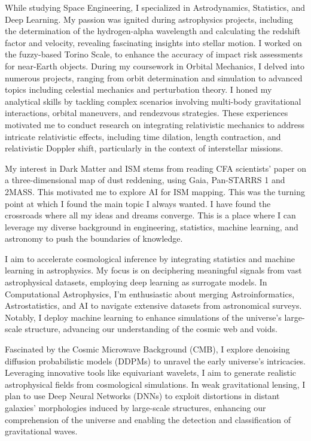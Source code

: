 \documentclass[a4,20pt]{article}
\begin{document}
\begin{large}
While studying Space Engineering, I specialized in Astrodynamics, Statistics, and Deep Learning. My passion was ignited during astrophysics projects, including the determination of the hydrogen-alpha wavelength and calculating the redshift factor and velocity, revealing fascinating insights into stellar motion. I worked on the fuzzy-based Torino Scale, to enhance the accuracy of impact risk assessments for near-Earth objects. During my coursework in Orbital Mechanics, I delved into numerous projects, ranging from orbit determination and simulation to advanced topics including celestial mechanics and perturbation theory. I honed my analytical skills by tackling complex scenarios involving multi-body gravitational interactions, orbital maneuvers, and rendezvous strategies. These experiences motivated me to conduct research on integrating relativistic mechanics to address intricate relativistic effects, including time dilation, length contraction, and relativistic Doppler shift, particularly in the context of interstellar missions. 


My interest in Dark Matter and ISM stems from reading CFA scientists' paper on a three-dimensional map of dust reddening, using Gaia, Pan-STARRS 1 and 2MASS. This motivated me to explore AI for ISM mapping. This was the turning point at which I found the main topic I always wanted. I have found the crossroads where all my ideas and dreams converge. This is a place where I can leverage my diverse background in engineering, statistics, machine learning, and astronomy to push the boundaries of knowledge.

I aim to accelerate cosmological inference by integrating statistics and machine learning in astrophysics. My focus is on deciphering meaningful signals from vast astrophysical datasets, employing deep learning as surrogate models. In Computational Astrophysics, I'm enthusiastic about merging Astroinformatics, Astrostatistics, and AI to navigate extensive datasets from astronomical surveys. Notably, I deploy machine learning to enhance simulations of the universe's large-scale structure, advancing our understanding of the cosmic web and voids.

Fascinated by the Cosmic Microwave Background (CMB), I explore denoising diffusion probabilistic models (DDPMs) to unravel the early universe's intricacies. Leveraging innovative tools like equivariant wavelets, I aim to generate realistic astrophysical fields from cosmological simulations. In weak gravitational lensing, I plan to use Deep Neural Networks (DNNs) to exploit distortions in distant galaxies' morphologies induced by large-scale structures, enhancing our comprehension of the universe and enabling the detection and classification of gravitational waves.


\end{large}
\end{document}

